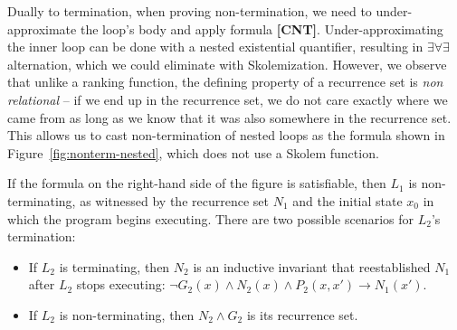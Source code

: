 \documentclass[a4paper]{llncs}
\begin{document}
Dually to termination, when proving non-termination, we need to
under-approximate the loop's body and apply formula {\bf [CNT]}.
%
% 
%
%
Under-approximating the inner loop can be done with a nested existential quantifier, resulting in
$\exists \forall \exists$ alternation, which we could eliminate with Skolemization.  
However, we observe that
unlike a ranking function,
the defining property of a recurrence set is \emph{non relational} -- if we
end up in the recurrence set, we do not care exactly where we came from as
long as we know that it was also somewhere in the recurrence set.  
This allows us to cast non-termination of nested loops as the formula shown in
Figure~\ref{fig:nonterm-nested}, which does not use a Skolem function.

If the formula on the right-hand side of the figure is satisfiable, then
$L_1$ is non-terminating, as witnessed by the recurrence set $N_1$ and the
initial state $x_0$ in which the program begins executing.  There are two
possible scenarios for $L_2$'s termination:
%
\begin{itemize}
%
\item If $L_2$ is terminating, then $N_2$ is an inductive invariant that
reestablished $N_1$ after $L_2$ stops executing: $\lnot G_2(x) \wedge N_2(x)
\wedge P_2(x,x') \rightarrow N_1(x') $.
%
\item If $L_2$ is non-terminating, then $N_2 \wedge G_2$ is its recurrence set.
%
\end{itemize}

\end{document}
